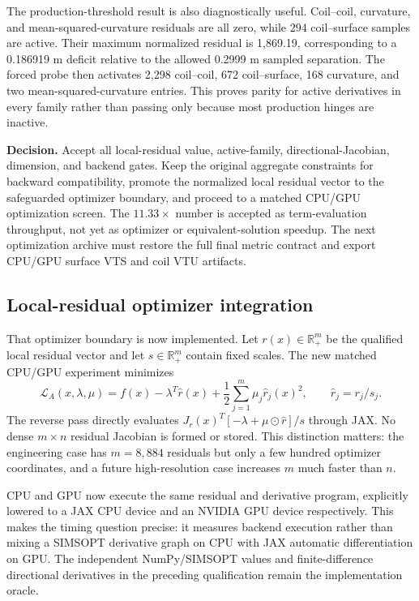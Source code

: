 \documentclass[11pt,a4paper]{article}
\begin{document}
The production-threshold result is also diagnostically useful.  Coil--coil,
curvature, and mean-squared-curvature residuals are all zero, while 294
coil--surface samples are active.  Their maximum normalized residual is
1,869.19, corresponding to a 0.186919 m deficit relative to the allowed
0.2999 m sampled separation.  The forced probe then activates 2,298
coil--coil, 672 coil--surface, 168 curvature, and two mean-squared-curvature
entries.  This proves parity for active derivatives in every family rather than
passing only because most production hinges are inactive.

\textbf{Decision.}  Accept all local-residual value, active-family,
directional-Jacobian, dimension, and backend gates.  Keep the original
aggregate constraints for backward compatibility, promote the normalized local
residual vector to the safeguarded optimizer boundary, and proceed to a matched
CPU/GPU optimization screen.  The $11.33\times$ number is accepted as
term-evaluation throughput, not yet as optimizer or equivalent-solution
speedup.  The next optimization archive must restore the full final metric
contract and export CPU/GPU surface VTS and coil VTU artifacts.

\subsection{Local-residual optimizer integration}

That optimizer boundary is now implemented.  Let $r(x)\in\mathbb{R}^m_+$ be
the qualified local residual vector and let $s\in\mathbb{R}^m_+$ contain fixed
scales.  The new matched CPU/GPU experiment minimizes
\begin{equation}
 \mathcal{L}_A(x,\lambda,\mu)
 = f(x)-\lambda^T\widehat r(x)
   +\frac{1}{2}\sum_{j=1}^{m}\mu_j\widehat r_j(x)^2,
 \qquad \widehat r_j=r_j/s_j.
\end{equation}
The reverse pass directly evaluates
$J_r(x)^T[-\lambda+\mu\odot\widehat r]/s$ through JAX.  No dense
$m\times n$ residual Jacobian is formed or stored.  This distinction matters:
the engineering case has $m=8{,}884$ residuals but only a few hundred optimizer
coordinates, and a future high-resolution case increases $m$ much faster than
$n$.

CPU and GPU now execute the same residual and derivative program, explicitly
lowered to a JAX CPU device and an NVIDIA GPU device respectively.  This makes
the timing question precise: it measures backend execution rather than mixing
a SIMSOPT derivative graph on CPU with JAX automatic differentiation on GPU.
The independent NumPy/SIMSOPT values and finite-difference directional
derivatives in the preceding qualification remain the implementation oracle.
\end{document}
